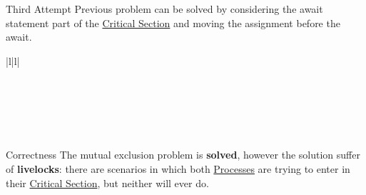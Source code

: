 \begin{remark}{Third Attempt}{}
    Previous problem can be solved by considering the await statement part of the \hyperref[def:crit-sec]{Critical Section} and moving the assignment before the await.
    \begin{ctable}{|l|l|}
        \hline
         \\
        \hline
         \\
         \\
        \hline
         \\
         \\
         \\
        \hline
    \end{ctable}
    \begin{outerproof}{Correctness}{}
        The mutual exclusion problem is \textbf{solved}, however the solution suffer of \textbf{livelocks}: there are scenarios in which both \hyperref[def:process]{Processes} are trying to enter in their \hyperref[def:crit-sec]{Critical Section}, but neither will ever do.
    \end{outerproof}
\end{remark}
